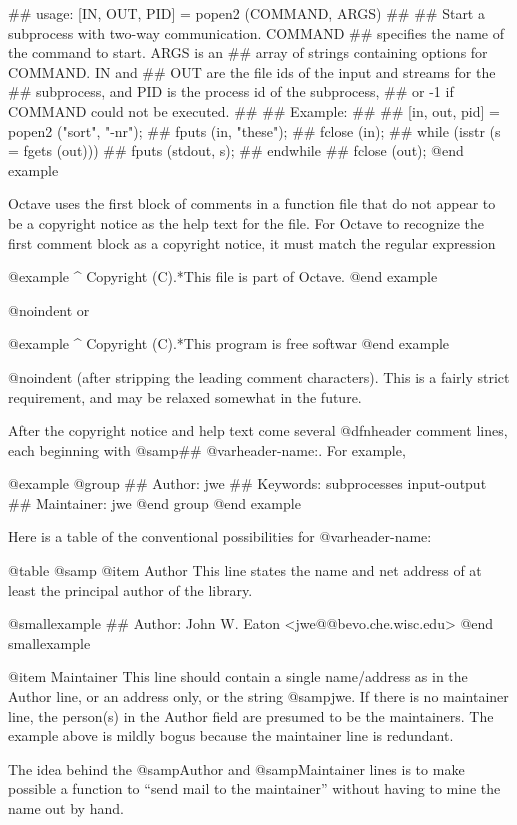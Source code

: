 ## usage: [IN, OUT, PID] = popen2 (COMMAND, ARGS)
##
## Start a subprocess with two-way communication.  COMMAND
## specifies the name of the command to start.  ARGS is an
## array of strings containing options for COMMAND.  IN and
## OUT are the file ids of the input and streams for the
## subprocess, and PID is the process id of the subprocess,
## or -1 if COMMAND could not be executed.
##
## Example:
##
##  [in, out, pid] = popen2 ("sort", "-nr");
##  fputs (in, "these\nare\nsome\nstrings\n");
##  fclose (in);
##  while (isstr (s = fgets (out)))
##    fputs (stdout, s);
##  endwhile
##  fclose (out);
@end example

Octave uses the first block of comments in a function file that do not
appear to be a copyright notice as the help text for the file.  For
Octave to recognize the first comment block as a copyright notice, it
must match the regular expression

@example
^ Copyright (C).*\n\n This file is part of Octave.
@end example

@noindent
or

@example
^ Copyright (C).*\n\n This program is free softwar
@end example

@noindent
(after stripping the leading comment characters).  This is a fairly
strict requirement, and may be relaxed somewhat in the future.

After the copyright notice and help text come several @dfn{header
comment} lines, each beginning with @samp{## @var{header-name}:}.  For
example,

@example
@group
## Author: jwe
## Keywords: subprocesses input-output
## Maintainer: jwe
@end group
@end example

Here is a table of the conventional possibilities for @var{header-name}:

@table @samp
@item Author
This line states the name and net address of at least the principal
author of the library.

@smallexample
## Author: John W. Eaton <jwe@@bevo.che.wisc.edu>
@end smallexample

@item Maintainer
This line should contain a single name/address as in the Author line, or
an address only, or the string @samp{jwe}.  If there is no maintainer
line, the person(s) in the Author field are presumed to be the
maintainers.  The example above is mildly bogus because the maintainer
line is redundant.

The idea behind the @samp{Author} and @samp{Maintainer} lines is to make
possible a function to ``send mail to the maintainer'' without
having to mine the name out by hand.

